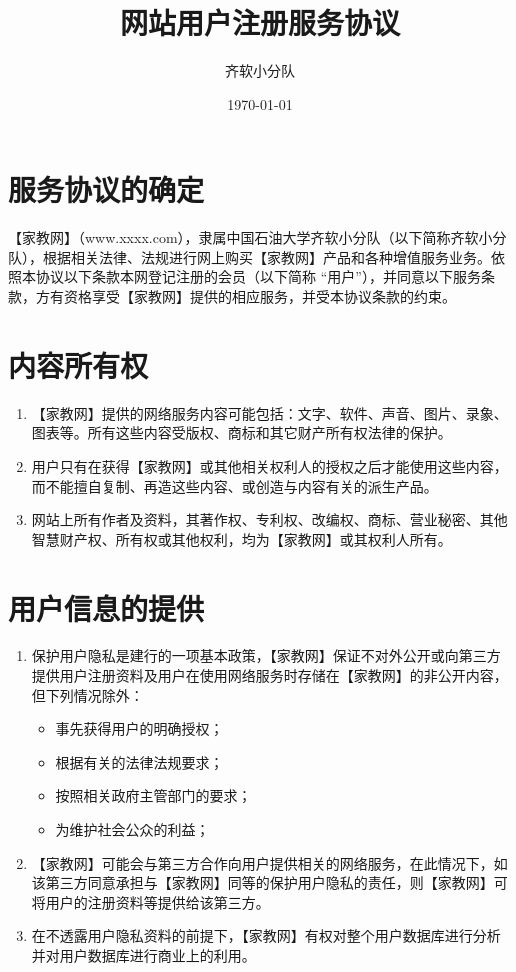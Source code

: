 \documentclass[UTF8]{ctexart}
\title{网站用户注册服务协议}
\author{齐软小分队}
\date{\today}
\newcommand{\proName}{【家教网】}
\newcommand{\groupName}{齐软小分队}
\begin{document}
    \maketitle
    \tableofcontents
    \newpage
    \section{服务协议的确定}
        {\proName}（www.xxxx.com），隶属中国石油大学齐软小分队（以下简称{\groupName}），根据相关法律、法规进行网上购买{\proName}产品和各种增值服务业务。依照本协议以下条款本网登记注册的会员（以下简称 “用户”），并同意以下服务条款，方有资格享受{\proName}提供的相应服务，并受本协议条款的约束。
    \section{内容所有权}
        \begin{enumerate}
            \item {\proName}提供的网络服务内容可能包括：文字、软件、声音、图片、录象、图表等。所有这些内容受版权、商标和其它财产所有权法律的保护。
            \item 用户只有在获得{\proName}或其他相关权利人的授权之后才能使用这些内容，而不能擅自复制、再造这些内容、或创造与内容有关的派生产品。 
            \item 网站上所有作者及资料，其著作权、专利权、改编权、商标、营业秘密、其他智慧财产权、所有权或其他权利，均为{\proName}或其权利人所有。
        \end{enumerate}
    \section{用户信息的提供}
        \begin{enumerate}
            \item 保护用户隐私是建行的一项基本政策，{\proName}保证不对外公开或向第三方提供用户注册资料及用户在使用网络服务时存储在{\proName}的非公开内容，但下列情况除外： 
                \begin{itemize}
                    \item 事先获得用户的明确授权；
                    \item 根据有关的法律法规要求；
                    \item 按照相关政府主管部门的要求；
                    \item 为维护社会公众的利益；
                \end{itemize}
            \item {\proName}可能会与第三方合作向用户提供相关的网络服务，在此情况下，如该第三方同意承担与{\proName}同等的保护用户隐私的责任，则{\proName}可将用户的注册资料等提供给该第三方。
            \item 在不透露用户隐私资料的前提下，{\proName}有权对整个用户数据库进行分析并对用户数据库进行商业上的利用。
        \end{enumerate}
\end{document}
